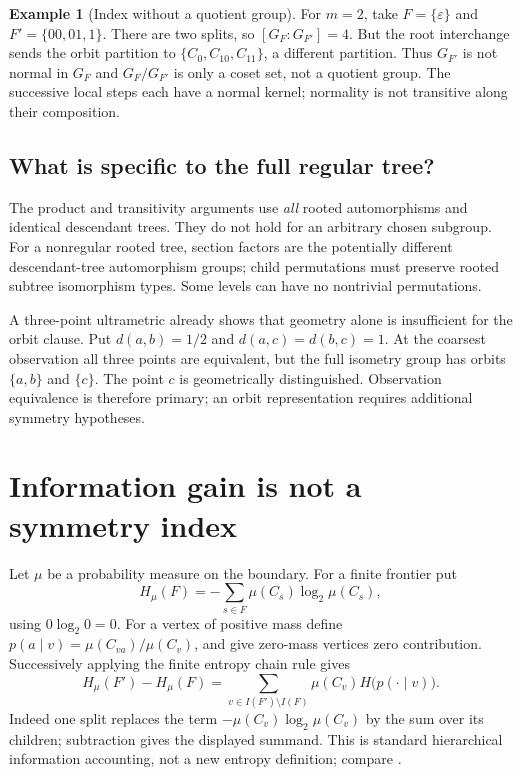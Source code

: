 \documentclass[11pt]{article}
\theoremstyle{definition}
\newtheorem{example}[theorem]{Example}
\theoremstyle{remark}
\newcommand{\eps}{\varepsilon}
\begin{document}
\begin{example}[Index without a quotient group]\label{ex:nonnormal}
For $m=2$, take $F=\{\eps\}$ and $F'=\{00,01,1\}$. There are two splits, so $[G_F:G_{F'}]=4$. But the root interchange sends the orbit partition to $\{C_0,C_{10},C_{11}\}$, a different partition. Thus $G_{F'}$ is not normal in $G_F$ and $G_F/G_{F'}$ is only a coset set, not a quotient group. The successive local steps each have a normal kernel; normality is not transitive along their composition.
\end{example}

\subsection{What is specific to the full regular tree?}
The product and transitivity arguments use \emph{all} rooted automorphisms and identical descendant trees. They do not hold for an arbitrary chosen subgroup. For a nonregular rooted tree, section factors are the potentially different descendant-tree automorphism groups; child permutations must preserve rooted subtree isomorphism types. Some levels can have no nontrivial permutations.

A three-point ultrametric already shows that geometry alone is insufficient for the orbit clause. Put $d(a,b)=1/2$ and $d(a,c)=d(b,c)=1$. At the coarsest observation all three points are equivalent, but the full isometry group has orbits $\{a,b\}$ and $\{c\}$. The point $c$ is geometrically distinguished. Observation equivalence is therefore primary; an orbit representation requires additional symmetry hypotheses.

\section{Information gain is not a symmetry index}\label{sec:information}
Let $\mu$ be a probability measure on the boundary. For a finite frontier put
\[
H_\mu(F)=-\sum_{s\in F}\mu(C_s)\log_2\mu(C_s),
\]
using $0\log_2 0=0$. For a vertex of positive mass define $p(a\mid v)=\mu(C_{va})/\mu(C_v)$, and give zero-mass vertices zero contribution. Successively applying the finite entropy chain rule gives
\begin{equation}\label{eq:entropy}
 H_\mu(F')-H_\mu(F)
 =\sum_{v\in I(F')\setminus I(F)}\mu(C_v)H\bigl(p(\cdot\mid v)\bigr).
\end{equation}
Indeed one split replaces the term $-\mu(C_v)\log_2\mu(C_v)$ by the sum over its children; subtraction gives the displayed summand. This is standard hierarchical information accounting, not a new entropy definition; compare \cite[Equations (7) and (10)]{Perotti2020}.
\end{document}
